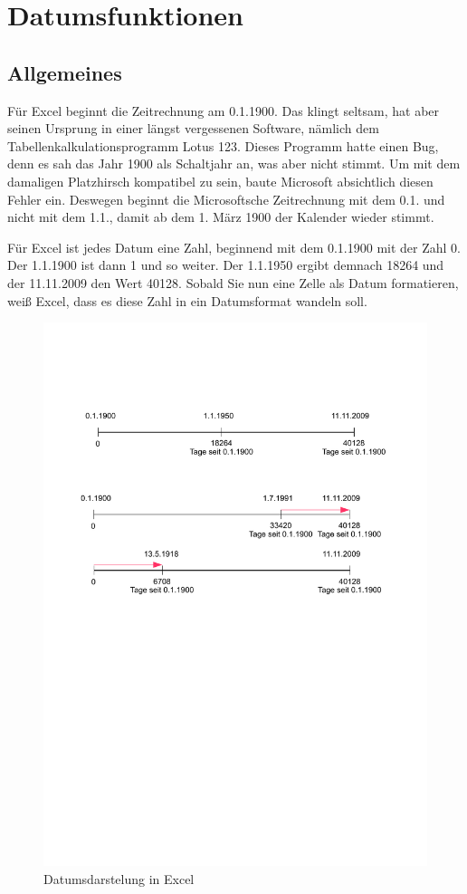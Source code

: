 \clearpage
\section{Datumsfunktionen}

\subsection{Allgemeines}

Für Excel beginnt die Zeitrechnung am 0.1.1900. Das klingt seltsam, hat aber seinen Ursprung in  einer längst vergessenen Software, nämlich dem Tabellenkalkulationsprogramm Lotus 123.
Dieses Programm hatte einen Bug, denn es sah das Jahr 1900 als Schaltjahr an, was aber nicht stimmt. Um mit dem damaligen Platzhirsch kompatibel zu sein, baute Microsoft absichtlich
diesen Fehler ein. Deswegen beginnt die Microsoftsche Zeitrechnung mit dem 0.1. und nicht mit dem 1.1., damit ab dem 1. März 1900 der Kalender wieder stimmt.

Für Excel ist jedes Datum eine Zahl, beginnend mit dem 0.1.1900 mit der Zahl 0. Der 1.1.1900 ist dann 1 und so weiter. Der 1.1.1950 ergibt demnach 18264 und der 11.11.2009 den Wert 40128. Sobald Sie nun eine Zelle als Datum formatieren, weiß Excel, dass es diese Zahl
in ein Datumsformat wandeln soll.
	\begin{figure}[H]
		\centering
			\includegraphics{_OpenOffice/datum.pdf}
		\caption{Datumsdarstelung in Excel}
		\label{fig:datum}
	\end{figure}

